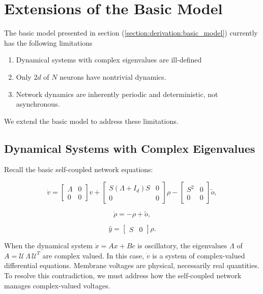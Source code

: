 \section{Extensions of the Basic Model}
The basic model presented in section (\ref{section:derivation:basic_model}) currently has the following limitations
\begin{enumerate}
\item Dynamical systems with complex eigenvalues are ill-defined
\item Only $2d$ of $N$ neurons have nontrivial dynamics. 
\item Network dynamics are inherently periodic and deterministic, not asynchronous. 
\end{enumerate}

We extend the basic model to address these limitations. 

\subsection{Dynamical Systems with Complex Eigenvalues}
Recall the basic self-coupled network equations:

$$
\dot{v}
= 
\begin{bmatrix}
\Lambda & 0
\\
0 & 0
\end{bmatrix}
v +
\begin{bmatrix}
S \left(\Lambda + I_d \right) S & 0
\\
0 & 0
\end{bmatrix}
  \rho - 
 \begin{bmatrix}
S^2 & 0
\\
0 & 0
\end{bmatrix}
    \tilde{o},
$$

$$
\dot{\rho} = -\rho + \tilde{o},
$$

$$
\hat{y} = \begin{bmatrix}
S & 0
\end{bmatrix}
\rho.
$$

When the dynamical system $\dot{x} = Ax + Bc$ is oscillatory, the eigenvalues $\Lambda$ of $A=\mathcal{U} \, \Lambda \, \mathcal{U}^T$ are complex valued. In this case, $\dot{v}$ is a system of complex-valued differential equations. Membrane voltages are physical, necessarily real quantities. To resolve this contradiction, we must address how the self-coupled network manages complex-valued voltages. 

